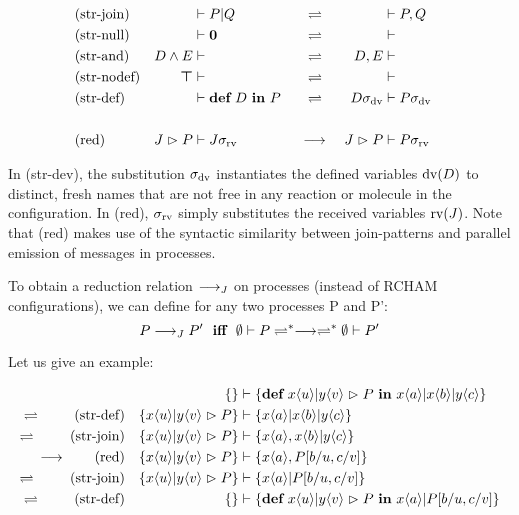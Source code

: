 \begin{align*}
  \rchamequ{str-join}{
    \rchamcnf*{}{P \jpar Q}
  }{
    \rchamcnf*{}{P, Q}
  }
  \\
  \rchamequ{str-null}{
    \rchamcnf*{}{\jnullproc}
  }{
    \rchamcnf*{}{}
  }
  \\
  \rchamequ{str-and}{
    \rchamcnf*{D \jcon E}{}
  }{
    \rchamcnf*{D, E}{}
  }
  \\
  \rchamequ{str-nodef}{
    \rchamcnf*{\jnulldef}{}
  }{
    \rchamcnf*{}{}
  }
  \\
  \rchamequ{str-def}{
    \rchamcnf*{}{\jdef{D}{P}}
  }{
    \rchamcnf*{D\sigma_{\opdv}}{P\sigma_{\opdv}}
  }
  \\
  \\
  \rchamred{red}{
    \rchamcnf*{\jrct{J}{P}}{J\sigma_{\oprv}}
  }{
    \rchamcnf*{\jrct{J}{P}}{P\sigma_{\oprv}}
  }
\end{align*}

\pagebreak

In (str-dev), the substitution $\sigma_{\operatorname{dv}}$ instantiates the defined
variables $\operatorname{dv}(D)$ to distinct, fresh names that are not free in any reaction
or molecule in the configuration.
In (red), $\sigma_{\operatorname{rv}}$ simply substitutes the received variables $\operatorname{rv}(J)$.
Note that (red) makes use of the syntactic similarity between join-patterns
and parallel emission of messages in processes.


To obtain a reduction relation $\longrightarrow_J$
on processes (instead of RCHAM configurations),
we can define for any two processes P and P':
\begin{equation*}
  P \joinreduction P'
  \ \ \textbf{iff} \ \ 
  \rchamcnf{\emptyset}{P}
  \rchamheating^*\rchamreduction\rchamheating^*
  \rchamcnf{\emptyset}{P'}
\end{equation*}

Let us give an example:

\begin{align*}
  &&\rchamcnfset*
    {}
    {\jdef
      {\jrct{\jrcv{x}{u} \jpat \jrcv{y}{v}}{P}}
      {\jsnd{x}{a} \jpar \jsnd{x}{b} \jpar \jsnd{y}{c}}}
  \\
  \rchamheating\ \tag{str-def}
  &&\rchamcnfset*
    {\jrct{\jrcv{x}{u} \jpat \jrcv{y}{v}}{P}}
    {\jsnd{x}{a} \jpar \jsnd{x}{b} \jpar \jsnd{y}{c}}
  \\
  \rchamheating\ \tag{str-join}
  &&\rchamcnfset*
    {\jrct{\jrcv{x}{u} \jpat \jrcv{y}{v}}{P}}
    {\jsnd{x}{a}, \jsnd{x}{b} \jpar \jsnd{y}{c}}
  \\
  \rchamreduction \tag{red}
  &&\rchamcnfset*
    {\jrct{\jrcv{x}{u} \jpat \jrcv{y}{v}}{P}}
    {\jsnd{x}{a}, P\substitution{\subst{b}{u}, \subst{c}{v}}}
  \\
  \rchamheating\ \tag{str-join}
  &&\rchamcnfset*
    {\jrct{\jrcv{x}{u} \jpat \jrcv{y}{v}}{P}}
    {\jsnd{x}{a} \jpar P\substitution{\subst{b}{u}, \subst{c}{v}}}
  \\
  \rchamheating\ \tag{str-def}
  &&\rchamcnfset*
    {}
    {\jdef
      {\jrct{\jrcv{x}{u} \jpat \jrcv{y}{v}}{P}}
      {\jsnd{x}{a} \jpar P\substitution{\subst{b}{u}, \subst{c}{v}}}}
\end{align*}

